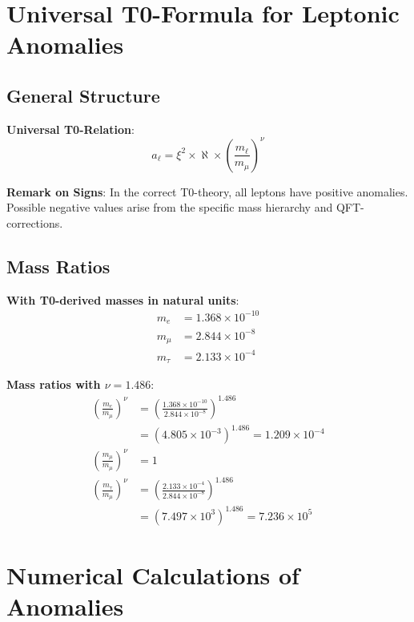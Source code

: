 \documentclass[12pt,a4paper]{article}
\newcommand{\xipar}{\xi}
\newcommand{\nulep}{\nu}
\begin{document}
	\section{Universal T0-Formula for Leptonic Anomalies}
	
	\subsection{General Structure}
	
	\textbf{Universal T0-Relation}:
	\begin{equation}
		a_\ell = \xipar^2 \times \aleph \times \left(\frac{m_\ell}{m_\mu}\right)^\nulep
	\end{equation}
	
	\textbf{Remark on Signs}: In the correct T0-theory, all leptons have positive anomalies. Possible negative values arise from the specific mass hierarchy and QFT-corrections.
	
	\subsection{Mass Ratios}
	
	\textbf{With T0-derived masses in natural units}:
	\begin{align}
		m_e &= 1{.}368 \times 10^{-10} \\
		m_\mu &= 2{.}844 \times 10^{-8} \\
		m_\tau &= 2{.}133 \times 10^{-4}
	\end{align}
	
	\textbf{Mass ratios with $\nulep = 1{.}486$}:
	\begin{align}
		\left(\frac{m_e}{m_\mu}\right)^\nulep &= \left(\frac{1{.}368 \times 10^{-10}}{2{.}844 \times 10^{-8}}\right)^{1{.}486} \\
		&= (4{.}805 \times 10^{-3})^{1{.}486} = 1{.}209 \times 10^{-4} \\
		\left(\frac{m_\mu}{m_\mu}\right)^\nulep &= 1 \\
		\left(\frac{m_\tau}{m_\mu}\right)^\nulep &= \left(\frac{2{.}133 \times 10^{-4}}{2{.}844 \times 10^{-8}}\right)^{1{.}486} \\
		&= (7{.}497 \times 10^3)^{1{.}486} = 7{.}236 \times 10^5
	\end{align}
	
	\section{Numerical Calculations of Anomalies}
	
\end{document}
